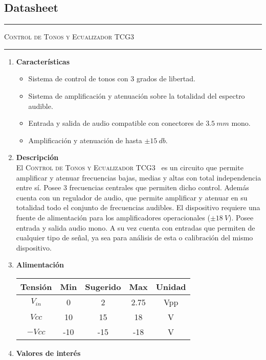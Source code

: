 \documentclass[a4paper]{article}
\begin{document}
\subsection{Datasheet}
\begin{center}
\rule{\textwidth}{1pt}
\textsc{Control de Tonos y Ecualizador TCG3 \textsuperscript{\textregistered}}
\rule{\textwidth}{1pt}
\end{center}

\begin{multicols}{2}

\begin{enumerate}
	\item[1] \textbf{Características}
	\begin{itemize}
		\item Sistema de control de tonos con 3 grados de libertad.
		\item Sistema de amplificación y atenuación sobre la totalidad del espectro audible.
		\item Entrada y salida de audio compatible con conectores de $3.5 \ mm$ mono.
		\item Amplificación y atenuación de hasta $\pm 15 \ db$.
	\end{itemize}
	
	\item[2] \textbf{Descripción}\\
		El \textsc{Control de Tonos y Ecualizador TCG3~\textsuperscript{\textregistered}} es un circuito que permite amplificar y atenuar frecuencias bajas, medias y altas con total independencia entre sí. Posee 3 frecuencias centrales que permiten dicho control. Además cuenta con un regulador de audio, que permite amplificar y atenuar en su totalidad todo el conjunto de frecuencias audibles. El dispositivo requiere una fuente de alimentación para los amplificadores operacionales ($\pm 18 \ V$). Posee entrada y salida audio mono. A su vez cuenta con entradas que permiten de cualquier tipo de señal, ya sea para análisis de esta o calibración del mismo dispositivo.
	
	\item[3] \textbf{Alimentación}\\
	\begin{table}[H]
		\begin{tabular}{ccccc}
			\hline	
			Tensión & Min & Sugerido & Max & Unidad \\
			\hline
			$V_{in}$    & 0 	& 2		   & 2.75	 	& Vpp \\
			$Vcc$       & 10  	& 15       & 18 	& V \\
			$-Vcc$      & -10 	& -15      & -18 	& V	\\
			\hline
		\end{tabular}
	\end{table}
		
	\item[4] \textbf{Valores de interés}\\
		

\end{enumerate}
\end{multicols}
\end{document}
